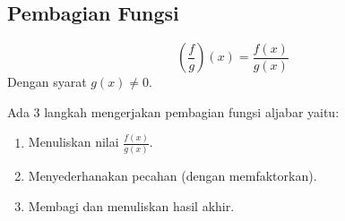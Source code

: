 \subsection{Pembagian Fungsi}
\begin{definition}
  \[ \left(\frac{f}{g}\right)(x) = \frac{f(x)}{g(x)} \]
  Dengan syarat $g(x) \ne 0$.
\end{definition}

Ada 3 langkah mengerjakan pembagian fungsi aljabar yaitu:
\begin{enumerate}
\item Menuliskan nilai $\frac{f(x)}{g(x)}$.
\item Menyederhanakan pecahan (dengan memfaktorkan).
\item Membagi dan menuliskan hasil akhir.
\end{enumerate}

